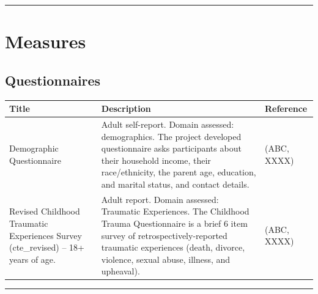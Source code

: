 \documentclass[]{book}
\begin{document}
\begin{center}\rule{0.5\linewidth}{0.5pt}\end{center}

\hypertarget{measures}{%
\section{Measures}\label{measures}}

\hypertarget{questionnaires}{%
\subsection{Questionnaires}\label{questionnaires}}

\begin{longtable}[]{@{}lll@{}}
\toprule
\begin{minipage}[b]{0.32\columnwidth}\raggedright
Title\strut
\end{minipage} & \begin{minipage}[b]{0.32\columnwidth}\raggedright
Description\strut
\end{minipage} & \begin{minipage}[b]{0.27\columnwidth}\raggedright
Reference\strut
\end{minipage}\tabularnewline
\midrule
\endhead
\begin{minipage}[t]{0.32\columnwidth}\raggedright
Demographic Questionnaire\strut
\end{minipage} & \begin{minipage}[t]{0.32\columnwidth}\raggedright
Adult self-report. Domain assessed: demographics. The project developed questionnaire asks participants about their household income, their race/ethnicity, the parent age, education, and marital status, and contact details.\strut
\end{minipage} & \begin{minipage}[t]{0.27\columnwidth}\raggedright
(ABC, XXXX)\strut
\end{minipage}\tabularnewline
\begin{minipage}[t]{0.32\columnwidth}\raggedright
Revised Childhood Traumatic Experiences Survey (cte\_revised) -- 18+ years of age.\strut
\end{minipage} & \begin{minipage}[t]{0.32\columnwidth}\raggedright
Adult report. Domain assessed: Traumatic Experiences. The Childhood Trauma Questionnaire is a brief 6 item survey of retrospectively-reported traumatic experiences (death, divorce, violence, sexual abuse, illness, and upheaval).\strut
\end{minipage} & \begin{minipage}[t]{0.27\columnwidth}\raggedright
(ABC, XXXX)\strut
\end{minipage}\tabularnewline
\bottomrule
\end{longtable}

\begin{center}\rule{0.5\linewidth}{0.5pt}\end{center}


\end{document}

